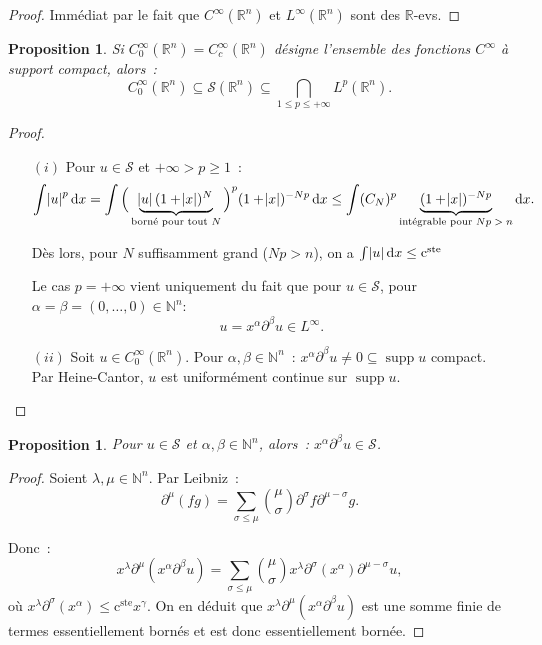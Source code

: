 \documentclass{report}
\DeclareMathOperator{\supp}{supp}
\newcommand{\R}{{\mathbb R}}
\newcommand{\N}{{\mathbb N}}
\newcommand{\pinfty}{{+\infty}}
\newcommand{\cste}{\text{c}^{\text{ste}}}
\newtheorem{prp}[thm]{Proposition}
\theoremstyle{definition}
\theoremstyle{remark}
\begin{document}
\begin{proof} Immédiat par le fait que $C^\infty(\R^n)$ et $L^\infty(\R^n)$ sont des $\R$-evs.
\end{proof}

\begin{prp} Si $C^\infty_0(\R^n) = C^\infty_c(\R^n)$ désigne l'ensemble des fonctions $C^\infty$ à support compact, alors~:
\[C^\infty_0(\R^n) \subseteq \mathcal S(\R^n) \subseteq \bigcap_{1 \leq p \leq \pinfty} L^p(\R^n).\]
\end{prp}

\begin{proof}~
\begin{itemize}
	\item[$(i)$] Pour $u \in \mathcal S$ et $\pinfty > p \geq 1$~:
	\[\int \abs u^p\dif x = \int \Big(\underbrace{\abs u(1+\abs x)^N}_{\text{borné pour tout $N$}}\Big)^p(1+\abs x)^{-Np}\dif x
		\leq \int (C_N)^p\underbrace {(1+\abs x)^{-Np}}_{\text{intégrable pour $Np > n$}}\dif x.\]

	Dès lors, pour $N$ suffisamment grand ($Np>n$), on a $\int \abs u\dif x \leq \cste$

	Le cas $p = \pinfty$ vient uniquement du fait que pour $u \in \mathcal S$, pour $\alpha = \beta = (0, \ldots, 0) \in \N^n$:
	\[u = x^\alpha\partial^\beta u \in L^\infty.\]

	\item[$(ii)$] Soit $u \in C^\infty_0(\R^n)$. Pour $\alpha, \beta \in \N^n$~: $x^\alpha\partial^\beta u \neq 0 \subseteq \supp u$ compact. Par Heine-Cantor,
	$u$ est uniformément continue sur $\supp u$.
\end{itemize}
\end{proof}

\begin{prp} Pour $u \in \mathcal S$ et $\alpha, \beta \in \N^n$, alors~: $x^\alpha\partial^\beta u \in \mathcal S$.
\end{prp}

\begin{proof} Soient $\lambda, \mu \in \N^n$. Par Leibniz~:
\[\partial^\mu(fg) = \sum_{\sigma \leq \mu}\binom \mu\sigma\partial^\sigma f \partial^{\mu-\sigma} g.\]

Donc~:
\[x^\lambda\partial^\mu(x^\alpha\partial^\beta u) = \sum_{\sigma \leq \mu}\binom \mu\sigma x^\lambda\partial^\sigma(x^\alpha)\partial^{\mu-\sigma}u,\]
où $x^\lambda\partial^\sigma(x^\alpha) \leq \cste x^\gamma$. On en déduit que $x^\lambda\partial^\mu(x^\alpha\partial^\beta u)$ est une somme finie de termes
essentiellement bornés et est donc essentiellement bornée.
\end{proof}
\end{document}
